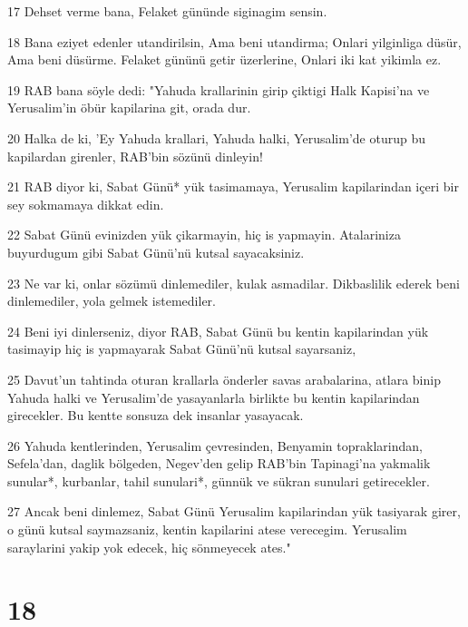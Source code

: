 \par 17 Dehset verme bana, Felaket gününde siginagim sensin.
\par 18 Bana eziyet edenler utandirilsin, Ama beni utandirma; Onlari yilginliga düsür, Ama beni düsürme. Felaket gününü getir üzerlerine, Onlari iki kat yikimla ez.
\par 19 RAB bana söyle dedi: "Yahuda krallarinin girip çiktigi Halk Kapisi'na ve Yerusalim'in öbür kapilarina git, orada dur.
\par 20 Halka de ki, 'Ey Yahuda krallari, Yahuda halki, Yerusalim'de oturup bu kapilardan girenler, RAB'bin sözünü dinleyin!
\par 21 RAB diyor ki, Sabat Günü* yük tasimamaya, Yerusalim kapilarindan içeri bir sey sokmamaya dikkat edin.
\par 22 Sabat Günü evinizden yük çikarmayin, hiç is yapmayin. Atalariniza buyurdugum gibi Sabat Günü'nü kutsal sayacaksiniz.
\par 23 Ne var ki, onlar sözümü dinlemediler, kulak asmadilar. Dikbaslilik ederek beni dinlemediler, yola gelmek istemediler.
\par 24 Beni iyi dinlerseniz, diyor RAB, Sabat Günü bu kentin kapilarindan yük tasimayip hiç is yapmayarak Sabat Günü'nü kutsal sayarsaniz,
\par 25 Davut'un tahtinda oturan krallarla önderler savas arabalarina, atlara binip Yahuda halki ve Yerusalim'de yasayanlarla birlikte bu kentin kapilarindan girecekler. Bu kentte sonsuza dek insanlar yasayacak.
\par 26 Yahuda kentlerinden, Yerusalim çevresinden, Benyamin topraklarindan, Sefela'dan, daglik bölgeden, Negev'den gelip RAB'bin Tapinagi'na yakmalik sunular*, kurbanlar, tahil sunulari*, günnük ve sükran sunulari getirecekler.
\par 27 Ancak beni dinlemez, Sabat Günü Yerusalim kapilarindan yük tasiyarak girer, o günü kutsal saymazsaniz, kentin kapilarini atese verecegim. Yerusalim saraylarini yakip yok edecek, hiç sönmeyecek ates."

\chapter{18}

